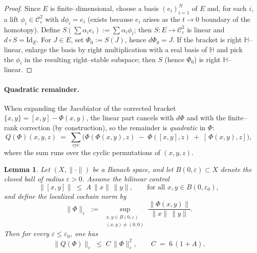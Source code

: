 \documentclass[10pt]{amsart}
\numberwithin{equation}{section}
\newtheorem{lem}[theorem]{Lemma}
\theoremstyle{remark}
\theoremstyle{definition}
\begin{document}
\begin{proof}
Since $E$ is finite--dimensional, choose a basis $(e_i)_{i=1}^N$ of $E$ and, for each $i$,
a lift $\phi_i\in\mathcal C^2_\varepsilon$ with $d\phi_i=e_i$ (exists because $e_i$ arises
as the $t\to 0$ boundary of the homotopy). Define $S(\sum \alpha_i e_i):=\sum \alpha_i \phi_i$;
then $S:E\to \mathcal C^2_\varepsilon$ is linear and $d\circ S=\mathrm{Id}_E$.
For $J\in E$, set $\Phi_0:=S(J)$, hence $d\Phi_0=J$. If the bracket is right
$\mathbb H$--linear, enlarge the basis by right multiplication with a real basis of $\mathbb H$
and pick the $\phi_i$ in the resulting right--stable subspace; then $S$ (hence $\Phi_0$) is
right $\mathbb H$--linear.
\end{proof}
\paragraph{Quadratic remainder.}
When expanding the Jacobiator of the corrected bracket $\{x,y\}=[x,y]-\Phi(x,y)$,
the linear part cancels with $d\Phi$ and with the finite--rank correction (by construction),
so the remainder is \emph{quadratic} in $\Phi$:
\[
Q(\Phi)(x,y,z)\;=\;\sum_{\mathrm{cyc}}
\Big(
  \Phi(\Phi(x,y),z)\;-\;\Phi([x,y],z)\;+\;[\,\Phi(x,y),z]
\Big),
\]
where the sum runs over the cyclic permutations of $(x,y,z)$.
\begin{lem}\label{lem:QPhi}
Let $(X,\|\cdot\|)$ be a Banach space, and let $B(0,\varepsilon)\subset X$ denote the closed ball of radius $\varepsilon>0$.
Assume the bilinear control
\begin{equation}\label{eq:bilinear-again}
\|[x,y]\| \;\le\; A\,\|x\|\,\|y\|, \qquad \text{for all } x,y\in B(0,\varepsilon_0),
\end{equation}
and define the localized cochain norm by
\[
\|\Phi\|_\varepsilon \;:=\; \sup_{\substack{x,y\in B(0,\varepsilon)\\ (x,y)\neq(0,0)}}
\frac{\|\Phi(x,y)\|}{\|x\|\,\|y\|}.
\]
Then for every $\varepsilon\le\varepsilon_0$, one has
\begin{equation}\label{eq:QPhi}
\|Q(\Phi)\|_\varepsilon \;\le\; C\,\|\Phi\|_\varepsilon^2,
\qquad
C\;=\;6\,(1+A).
\end{equation}
\end{lem}
\end{document}
